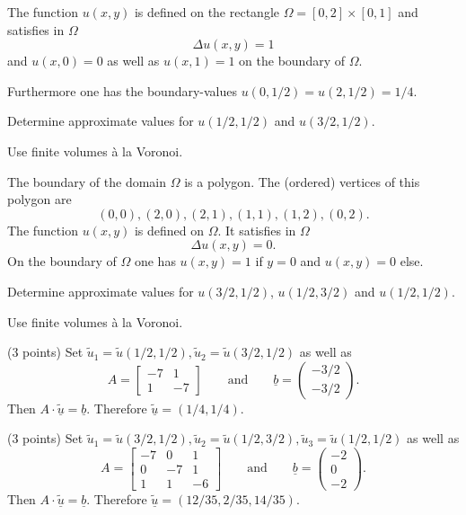 \begin{teilaufgaben}
\item
The function $u(x,y)$ is defined on the rectangle
$\Omega = [0,2] \times [0,1]$ %
and satisfies in $\Omega$ 
\[
\Delta u(x,y) = 1
\]
and $u(x,0) = 0$ as well as $u(x,1) = 1$ on the boundary of $\Omega$. 

Furthermore one has the boundary-values $u(0,1/2) = u(2,1/2) = 1/4$.

Determine approximate values for $u(1/2,1/2)$ and $u(3/2,1/2)$. 

Use finite volumes \`a la Voronoi.  

\item
The boundary of the domain $\Omega$ is a polygon.
The (ordered) vertices of this polygon are
\[
(0,0), (2,0), (2, 1), (1, 1), (1, 2), (0, 2).
\]
The function $u(x,y)$ is defined on $\Omega$.
It satisfies in $\Omega$ 
\[
\Delta u(x,y) = 0.
\]
On the boundary of $\Omega$ one has $u(x,y) = 1$ if $y = 0$ and $u(x,y) = 0$
else.

Determine approximate values for $u(3/2,1/2)$, $u(1/2,3/2)$ and $u(1/2,1/2)$.

Use finite volumes \`a la Voronoi.  
\end{teilaufgaben}

\begin{loesung}
\begin{teilaufgaben}
\item
(3 points)
Set $\tilde u_1 = \tilde u(1/2,1/2), \tilde u_2 = \tilde u(3/2,1/2)$ as well as
\[
A = \left[\begin{array}{rr} -7 & 1  \\ 1 & -7  \end{array}\right]
\qquad \text{and} \qquad
\underline{b} =  \left(\begin{array}{r} -3/2 \\ -3/2 \end{array}\right).
\]
Then $A \cdot \underline{\tilde u} = \underline{b}$.
Therefore $\underline{\tilde u} = (1/4,1/4)$.
\item
(3 points)
Set $\tilde u_1 = \tilde u(3/2,1/2), \tilde u_2 = \tilde u(1/2,3/2),
\tilde u_3 = \tilde u(1/2,1/2)$  as well as
\[
A
=
\left[\begin{array}{rrr}
-7 & 0 & 1  \\
0 & -7 & 1 \\
1 & 1 & -6 \end{array}\right]
\qquad\text{and}\qquad
\underline{b} =  \left(\begin{array}{r} -2 \\ 0 \\ -2\end{array}\right).
\]
Then  $A \cdot \underline{\tilde u} = \underline{b}$.
Therefore $\underline{\tilde u} = (12/35,2/35,14/35)$.
\qedhere
\end{teilaufgaben}
\end{loesung}
